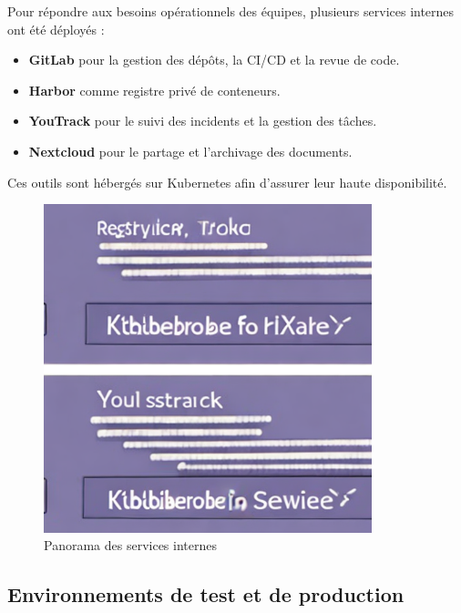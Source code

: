 Pour répondre aux besoins opérationnels des équipes, plusieurs services internes ont été déployés :
\begin{itemize}
	\item \textbf{GitLab} pour la gestion des dépôts, la CI/CD et la revue de code.
	\item \textbf{Harbor} comme registre privé de conteneurs.
	\item \textbf{YouTrack} pour le suivi des incidents et la gestion des tâches.
	\item \textbf{Nextcloud} pour le partage et l’archivage des documents.
\end{itemize}

Ces outils sont hébergés sur Kubernetes afin d’assurer leur haute disponibilité.

\begin{figure}[H]
	\centering
	\includegraphics[width=0.85\textwidth]{figures/services-internes.png}
	\caption{Panorama des services internes}
\end{figure}

\subsection{Environnements de test et de production}

